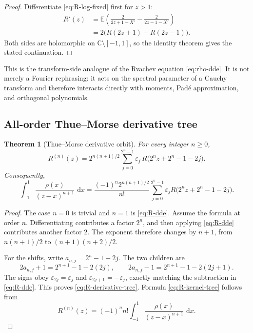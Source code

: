 \documentclass[11pt]{article}
\newtheorem{theorem}{Theorem}[section]
\theoremstyle{definition}
\theoremstyle{remark}
\newcommand{\C}{\mathbb C}
\newcommand{\E}{\mathbb E}
\newcommand{\dd}{\,\mathrm d}
\newcommand{\eps}{\varepsilon}
\begin{document}
\begin{proof}
Differentiate \eqref{eq:R-log-fixed} first for \(z>1\):
\begin{align*}
 R'(z)
 &=\E\left(\frac{2}{2z+1-X'}-\frac{2}{2z-1-X'}\right)\\
 &=2\bigl(R(2z+1)-R(2z-1)\bigr).
\end{align*}
Both sides are holomorphic on \(\C\setminus[-1,1]\), so the identity theorem gives the
stated continuation.
\end{proof}

This is the transform-side analogue of the Rvachev equation \eqref{eq:rho-dde}.  It is
not merely a Fourier rephrasing: it acts on the spectral parameter of a Cauchy transform and
therefore interacts directly with moments, Pad\'e approximation, and orthogonal polynomials.

\subsection{All-order Thue--Morse derivative tree}

\begin{theorem}[Thue--Morse derivative orbit]\label{thm:R-derivative-tree}
For every integer \(n\ge0\),
\begin{equation}
 \boxed{
 R^{(n)}(z)=2^{n(n+1)/2}
 \sum_{j=0}^{2^n-1}\eps_j\,
 R\bigl(2^n z+2^n-1-2j\bigr).
 }                                                           \label{eq:R-derivative-tree}
\end{equation}
Consequently,
\begin{equation}
 \int_{-1}^{1}\frac{\rho(x)}{(z-x)^{n+1}}\,\dd x
 =\frac{(-1)^n2^{n(n+1)/2}}{n!}
 \sum_{j=0}^{2^n-1}\eps_j
 R\bigl(2^n z+2^n-1-2j\bigr).                               \label{eq:R-kernel-tree}
\end{equation}
\end{theorem}

\begin{proof}
The case \(n=0\) is trivial and \(n=1\) is \eqref{eq:R-dde}.  Assume the formula at
order \(n\).  Differentiating contributes a factor \(2^n\), and then applying
\eqref{eq:R-dde} contributes another factor \(2\).  The exponent therefore changes by
\(n+1\), from \(n(n+1)/2\) to \((n+1)(n+2)/2\).

For the shifts, write \(a_{n,j}=2^n-1-2j\).  The two children are
\[
 2a_{n,j}+1=2^{n+1}-1-2(2j),
 \qquad
 2a_{n,j}-1=2^{n+1}-1-2(2j+1).
\]
The signs obey \(\eps_{2j}=\eps_j\) and \(\eps_{2j+1}=-\eps_j\), exactly matching the
subtraction in \eqref{eq:R-dde}.  This proves \eqref{eq:R-derivative-tree}.  Formula
\eqref{eq:R-kernel-tree} follows from
\[
 R^{(n)}(z)=(-1)^n n!\int_{-1}^{1}\frac{\rho(x)}{(z-x)^{n+1}}\,\dd x.
\]
\end{proof}
\end{document}
